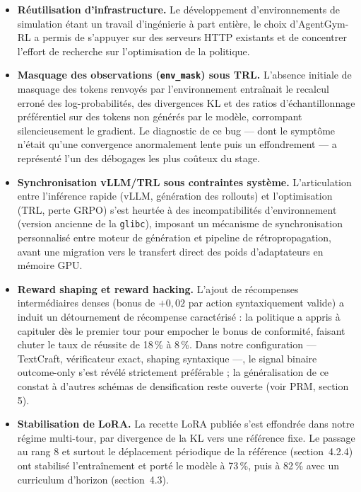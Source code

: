 \documentclass[11pt,a4paper]{article}
\begin{document}
\begin{itemize}
    \item \textbf{Réutilisation d'infrastructure.} Le développement d'environnements de simulation étant un travail d'ingénierie à part entière, le choix d'AgentGym-RL a permis de s'appuyer sur des serveurs HTTP existants et de concentrer l'effort de recherche sur l'optimisation de la politique.
    \item \textbf{Masquage des observations (\texttt{env\_mask}) sous TRL.} L'absence initiale de masquage des tokens renvoyés par l'environnement entraînait le recalcul erroné des log-probabilités, des divergences KL et des ratios d'échantillonnage préférentiel sur des tokens non générés par le modèle, corrompant silencieusement le gradient. Le diagnostic de ce bug — dont le symptôme n'était qu'une convergence anormalement lente puis un effondrement — a représenté l'un des débogages les plus coûteux du stage.
    \item \textbf{Synchronisation vLLM/TRL sous contraintes système.} L'articulation entre l'inférence rapide (vLLM, génération des rollouts) et l'optimisation (TRL, perte GRPO) s'est heurtée à des incompatibilités d'environnement (version ancienne de la \texttt{glibc}), imposant un mécanisme de synchronisation personnalisé entre moteur de génération et pipeline de rétropropagation, avant une migration vers le transfert direct des poids d'adaptateurs en mémoire GPU.
    \item \textbf{Reward shaping et reward hacking.} L'ajout de récompenses intermédiaires denses (bonus de $+0{,}02$ par action syntaxiquement valide) a induit un détournement de récompense caractérisé \cite{skalse2022defining} : la politique a appris à capituler dès le premier tour pour empocher le bonus de conformité, faisant chuter le taux de réussite de 18\,\% à 8\,\%. Dans notre configuration — TextCraft, vérificateur exact, shaping syntaxique —, le signal binaire outcome-only s'est révélé strictement préférable ; la généralisation de ce constat à d'autres schémas de densification reste ouverte (voir PRM, section 5).
    \item \textbf{Stabilisation de LoRA.} La recette LoRA publiée s'est effondrée dans notre régime multi-tour, par divergence de la KL vers une référence fixe. Le passage au rang 8 et surtout le déplacement périodique de la référence (section~4.2.4) ont stabilisé l'entraînement et porté le modèle à 73\,\%, puis à 82\,\% avec un curriculum d'horizon (section~4.3).

\end{itemize}
\end{document}

